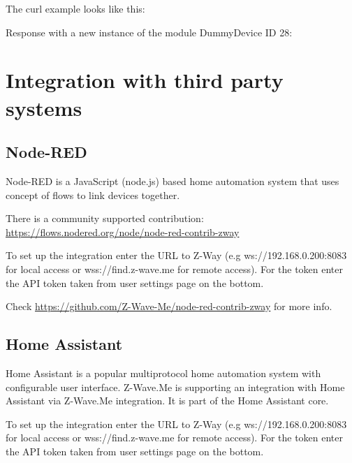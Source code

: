 The curl example looks like this:
{\scriptsize
\begin{quote} 
\end{quote}
}

Response with a new instance of the module DummyDevice ID 28:
\begin{listingverbatim}
\{
  "data": {
    "module": "DummyDevice",
    "id": 28,
    "config": {
      "deviceType": "switchBinary"
    }
  },
  "code": 201,
  "message": "201 Created",
  "error": null
}
\end{listingverbatim}

\section{Integration with third party systems}
\label{integratingzway}

\subsection{Node-RED}
Node-RED is a JavaScript (node.js) based home automation system that uses
concept of flows to link devices together.

There is a community supported contribution:
\url{https://flows.nodered.org/node/node-red-contrib-zway}

To set up the integration enter the URL to Z-Way (e.g ws://192.168.0.200:8083
for local access or wss://find.z-wave.me for remote access). For the token
enter the API token taken from user settings page on the bottom.

Check \url{https://github.com/Z-Wave-Me/node-red-contrib-zway} for more
info.

\subsection{Home Assistant}
Home Assistant is a popular multiprotocol home automation system with
configurable user interface. Z-Wave.Me is supporting an integration with
Home Assistant via Z-Wave.Me integration. It is part of the Home Assistant
core.

To set up the integration enter the URL to Z-Way (e.g ws://192.168.0.200:8083
for local access or wss://find.z-wave.me for remote access). For the token
enter the API token taken from user settings page on the bottom.

